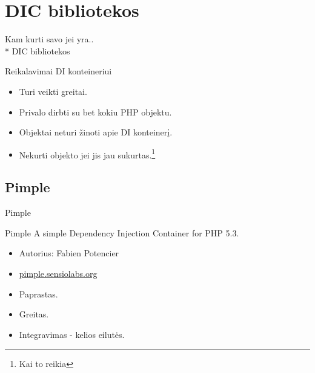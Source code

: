 \documentclass[12pt,a4paper]{beamer}
\begin{document}
\section{DIC bibliotekos}
\begin{frame}
	\begin{center}
        {\footnotesize Kam kurti savo jei yra..}\\*
        \vskip0.5cm
        {\Huge DIC bibliotekos}
	\end{center}
\end{frame}

\begin{frame}{Reikalavimai DI konteineriui}
    \begin{itemize}
        \item Turi veikti greitai.
        \item Privalo dirbti su bet kokiu PHP objektu.
        \item Objektai neturi žinoti apie DI konteinerį.
        \item Nekurti objekto jei jis jau sukurtas.\footnote{Kai to reikia}
    \end{itemize}
\end{frame}

\subsection{Pimple}
\begin{frame}
	\begin{center}
        {\Huge Pimple}
	\end{center}
\end{frame}

\begin{frame}{Pimple}
    A simple Dependency Injection Container for PHP 5.3.
    \begin{itemize}
        \item Autorius: Fabien Potencier
        \item \url{pimple.sensiolabs.org}
        \item Paprastas.
        \item Greitas.
        \item Integravimas - kelios eilutės.
    \end{itemize}
\end{frame}
\end{document}
